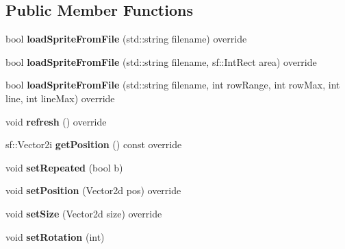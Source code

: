 \subsection*{Public Member Functions}
\begin{DoxyCompactItemize}
\item 
bool {\bfseries load\+Sprite\+From\+File} (std\+::string filename) override\hypertarget{class_otter_engine_1_1_fixed_sprite_a6bbca157005b2ad8e6aea134752132c8}{}\label{class_otter_engine_1_1_fixed_sprite_a6bbca157005b2ad8e6aea134752132c8}

\item 
bool {\bfseries load\+Sprite\+From\+File} (std\+::string filename, sf\+::\+Int\+Rect area) override\hypertarget{class_otter_engine_1_1_fixed_sprite_a76d3bf29eaafc17c91242f37e13ae477}{}\label{class_otter_engine_1_1_fixed_sprite_a76d3bf29eaafc17c91242f37e13ae477}

\item 
bool {\bfseries load\+Sprite\+From\+File} (std\+::string filename, int row\+Range, int row\+Max, int line, int line\+Max) override\hypertarget{class_otter_engine_1_1_fixed_sprite_a0a8b20686494482467b8e286c1a6bcd3}{}\label{class_otter_engine_1_1_fixed_sprite_a0a8b20686494482467b8e286c1a6bcd3}

\item 
void {\bfseries refresh} () override\hypertarget{class_otter_engine_1_1_fixed_sprite_a565d5266dfc5550bf3905e6a41991537}{}\label{class_otter_engine_1_1_fixed_sprite_a565d5266dfc5550bf3905e6a41991537}

\item 
sf\+::\+Vector2i {\bfseries get\+Position} () const override\hypertarget{class_otter_engine_1_1_fixed_sprite_a1b95ebe92cd89f975769b8eb9d6c0d41}{}\label{class_otter_engine_1_1_fixed_sprite_a1b95ebe92cd89f975769b8eb9d6c0d41}

\item 
void {\bfseries set\+Repeated} (bool b)\hypertarget{class_otter_engine_1_1_fixed_sprite_a6a75e3f08a7d86908532c02d0a2d6aca}{}\label{class_otter_engine_1_1_fixed_sprite_a6a75e3f08a7d86908532c02d0a2d6aca}

\item 
void {\bfseries set\+Position} (Vector2d pos) override\hypertarget{class_otter_engine_1_1_fixed_sprite_abd6fe0f18275d1da05f2bfa5c883a854}{}\label{class_otter_engine_1_1_fixed_sprite_abd6fe0f18275d1da05f2bfa5c883a854}

\item 
void {\bfseries set\+Size} (Vector2d size) override\hypertarget{class_otter_engine_1_1_fixed_sprite_a75b4a1de61ed0af04bcddc3ceb5d3c38}{}\label{class_otter_engine_1_1_fixed_sprite_a75b4a1de61ed0af04bcddc3ceb5d3c38}

\item 
void {\bfseries set\+Rotation} (int)\hypertarget{class_otter_engine_1_1_fixed_sprite_ac2606cb1329d55dddeb594fd3b314bab}{}\label{class_otter_engine_1_1_fixed_sprite_ac2606cb1329d55dddeb594fd3b314bab}

\end{DoxyCompactItemize}

